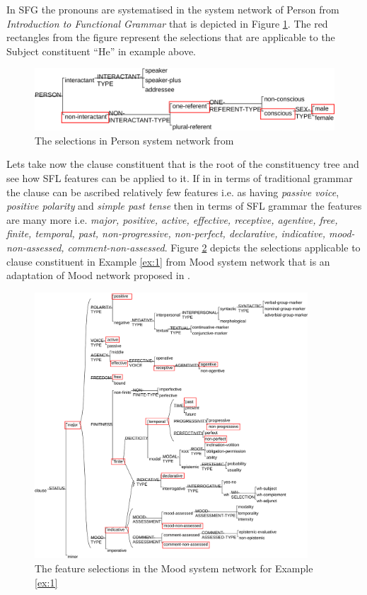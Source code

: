 In SFG the pronouns are systematised in the system network of Person from \textit{Introduction to Functional Grammar} \citep[366]{Halliday2013} that is depicted in Figure \ref{fig:person-system-network}. The red rectangles from the figure represent the selections that are applicable to the Subject constituent ``He'' in example above.

\begin{figure}[!ht]
    \centering      
    \includegraphics[width=.90\textwidth]{Figures/Example/person-selections.pdf}      
    \caption{The selections in Person system network from \citet[366]{Halliday2013} }
    \label{fig:person-system-network}
\end{figure}

Lets take now the clause constituent that is the root of the constituency tree and see how SFL features can be applied to it. If in in terms of traditional grammar the clause can be ascribed relatively few features i.e. as having \textit{passive voice}, \textit{positive polarity} and \textit{simple past tense} then in terms of SFL grammar the features are many more i.e. \textit{major, positive, active, effective, receptive, agentive, free, finite, temporal, past, non-progressive, non-perfect, declarative, indicative, mood-non-assessed, comment-non-assessed}. Figure \ref{fig:mood-selections} depicts the selections applicable to clause constituent in Example \ref{ex:1} from Mood system network that is an adaptation of Mood network proposed in \citet[162]{Halliday2013}. 

\begin{figure}[!ht]
    \centering      
    \includegraphics[width=0.91\textwidth]{Figures/Example/mood-selections.pdf}      
    \caption{The feature selections in the Mood system network for Example \ref{ex:1}}
    \label{fig:mood-selections}
\end{figure}

